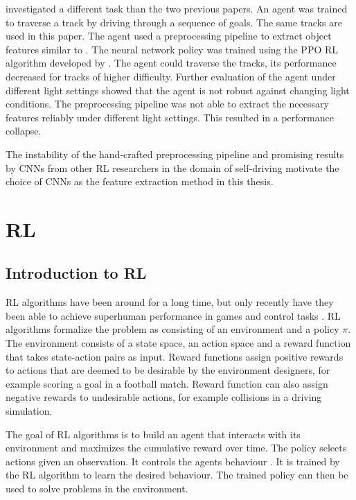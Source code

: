 \textcite{maximilian} investigated a different task than the two previous papers. An agent was trained to traverse a track by driving through a sequence of goals. The same tracks are used in this paper. The agent used a preprocessing pipeline to extract object features similar to \textcite{jonas_koenig}. The neural network policy was trained using the \ac{PPO} \ac{RL} algorithm developed by \textcite{ppo}. The agent could traverse the tracks, its performance decreased for tracks of higher difficulty. Further evaluation of the agent under different light settings showed that the agent is not robust against changing light conditions. The preprocessing pipeline was not able to extract the necessary features reliably under different light settings. This resulted in a performance collapse.

The instability of the hand-crafted preprocessing pipeline and promising results by \acp{CNN} from other RL researchers in the domain of self-driving \textcite{neptune} motivate the choice of \acp{CNN} as the feature extraction method in this thesis. 


\section{\acl{RL}}

\subsection{Introduction to \ac{RL}}

\ac{RL} algorithms have been around for a long time, but only recently have they been able to achieve superhuman performance in games and control tasks \autocite{atari}. \ac{RL} algorithms formalize the problem as consisting of an environment and a policy $\pi$. The environment consists of a state space, an action space and a reward function that takes state-action pairs as input. Reward functions assign positive rewards to actions that are deemed to be desirable by the environment designers, for example scoring a goal in a football match. Reward function can also assign negative rewards to undesirable actions, for example collisions in a driving simulation. 

The goal of \ac{RL} algorithms is to build an agent that interacts with its environment and maximizes the cumulative reward over time. The policy selects actions given an observation. It controls the agents behaviour \autocite{rlbook2020}. It is trained by the \ac{RL} algorithm to learn the desired behaviour. The trained policy can then be used to solve problems in the environment. 

